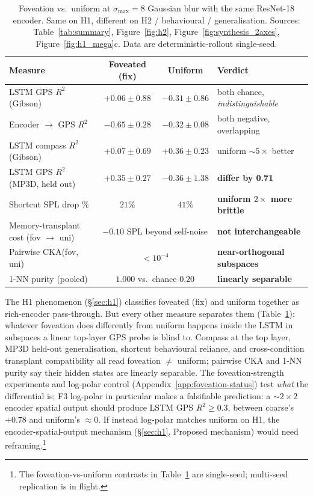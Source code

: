 \documentclass{article}
\newcommand{\uncertain}[1]{{\color{uncertaincol}#1}}
\newcommand{\pendnote}[1]{\footnote{\color{uncertaincol}\small #1}}
\newcommand{\hcpending}[1]{{\color{hcpendingcol}#1}}
\begin{document}
\begin{table}[!htbp]
\centering
\small
\setlength{\tabcolsep}{6pt}
\caption{Foveation vs.\ uniform at $\sigma_{\max} = 8$ Gaussian blur with the same ResNet-18 encoder. Same on H1, different on H2 / behavioural / generalisation. Sources: Table~\ref{tab:summary}, Figure~\ref{fig:h2}, Figure~\ref{fig:synthesis_2axes}, Figure~\ref{fig:h1_mega}c. Data are deterministic-rollout single-seed.}
\label{tab:fov-vs-uni}
\begin{tabular}{lccl}
\toprule
Measure & Foveated (fix) & Uniform & Verdict \\
\midrule
LSTM GPS $R^2$ (Gibson) & $+0.06\pm 0.88$ & $-0.31\pm 0.86$ & both chance, \emph{indistinguishable} \\
Encoder $\to$ GPS $R^2$ & $-0.65\pm 0.28$ & $-0.32\pm 0.08$ & both negative, overlapping \\
LSTM compass $R^2$ (Gibson) & $+0.07\pm 0.69$ & $+0.36\pm 0.23$ & uniform $\sim 5\times$ better\\
LSTM GPS $R^2$ (MP3D, held out) & $+0.35\pm 0.27$ & $-0.36\pm 1.38$ & \textbf{differ by 0.71}\\
Shortcut SPL drop \% & $21\%$ & $41\%$ & \textbf{uniform $2\times$ more brittle}\\
Memory-transplant cost (fov $\to$ uni) & \multicolumn{2}{c}{$-0.10$ SPL beyond self-noise} & \textbf{not interchangeable}\\
Pairwise CKA(fov, uni) & \multicolumn{2}{c}{$< 10^{-4}$} & \textbf{near-orthogonal subspaces}\\
1-NN purity (pooled) & \multicolumn{2}{c}{$1.000$ vs.\ chance $0.20$} & \textbf{linearly separable}\\
\bottomrule
\end{tabular}
\end{table}

The H1 phenomenon (§\ref{sec:h1}) classifies foveated (fix) and uniform together as rich-encoder pass-through. But every other measure separates them (Table~\ref{tab:fov-vs-uni}): \uncertain{whatever foveation does differently from uniform happens inside the LSTM in subspaces a linear top-layer GPS probe is blind to.} Compass at the top layer, MP3D held-out generalisation, shortcut behavioural reliance, and cross-condition transplant compatibility all read foveation $\neq$ uniform; pairwise CKA and 1-NN purity say their hidden states are linearly separable. The foveation-strength experiments and log-polar control (Appendix~\ref{app:foveation-status}) test \emph{what} the differential is; \hcpending{F3 log-polar in particular makes a falsifiable prediction: a $\sim 2{\times}2$ encoder spatial output should produce LSTM GPS $R^2 \geq 0.3$, between coarse's $+0.78$ and uniform's $\approx 0$. If instead log-polar matches uniform on H1, the encoder-spatial-output mechanism (§\ref{sec:h1}, Proposed mechanism) would need reframing.}\pendnote{The foveation-vs-uniform contrasts in Table~\ref{tab:fov-vs-uni} are single-seed; multi-seed replication is in flight.}
\end{document}
